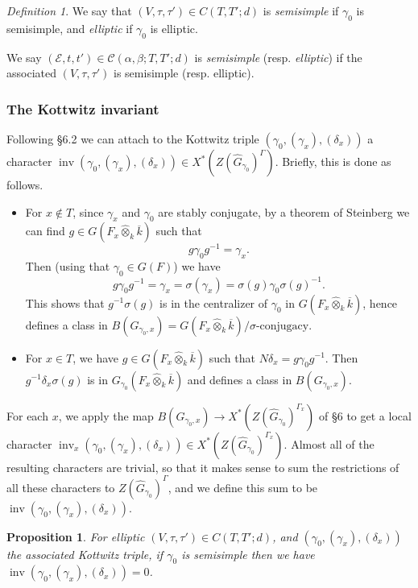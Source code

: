 \documentclass[reqno]{amsart}
\numberwithin{equation}{section}
\newcommand{\ol}[1]{\overline{#1}}
\newcommand{\wh}[1]{\widehat{#1}}
\newcommand{\Cal}[1]{\mathcal{#1}}
\DeclareMathOperator{\inv}{inv}
\newtheorem{prop}[thm]{Proposition}
\theoremstyle{remark}
\newtheorem{defn}[thm]{Definition}
\numberwithin{equation}{section}
\begin{document}
\begin{defn}
We say that $(V, \tau, \tau') \in C(T,T';d)$ is \emph{semisimple} if $\gamma_0$  is semisimple, and \emph{elliptic} if $\gamma_0$ is elliptic. 

We say $(\Cal{E},t, t')  \in \Cal{C}(\alpha, \beta; T,T'; d)$ is \emph{semisimple} (resp. \emph{elliptic}) if the associated $(V,\tau,\tau')$ is semisimple (resp. elliptic). 


\end{defn}

\subsubsection{The Kottwitz invariant} Following \cite{NgoNgo} \S 6.2 we can attach to the Kottwitz triple $(\gamma_0, (\gamma_x), (\delta_x))$ a character $\inv(\gamma_0, (\gamma_x), (\delta_x)) \in X^*(Z(\wh{G}_{\gamma_0})^{\Gamma})$. Briefly, this is done as follows. 

\begin{itemize}
\item For $x \notin T$, since $\gamma_x$ and $\gamma_0$ are stably conjugate, by a theorem of Steinberg we can find $g \in G(F_x \wh{\otimes}_{k} \ol{k})$ such that 
\[
g \gamma_0 g^{-1} = \gamma_x.
\] 
Then (using that $\gamma_0 \in G(F)$) we have 
\[
g \gamma_0 g^{-1} = \gamma_x = \sigma(\gamma_x) = \sigma(g) \gamma_0 \sigma(g)^{-1}.
\]
This shows that $g^{-1}\sigma(g)$ is in the centralizer  of $\gamma_0$ in $G(F_x \wh{\otimes}_{k} \ol{k})$, hence defines a class in $B(G_{\gamma_0, x}) = G(F_x \wh{\otimes}_{k} \ol{k})/\text{$\sigma$-conjugacy}$. 

\item For $x \in T$, we have $g \in G(F_x \wh{\otimes}_{k} \ol{k})$ such that $N \delta_x = g \gamma_0 g^{-1}$. Then $g^{-1} \delta_x \sigma(g)$ is in $G_{\gamma_0}(F_x\wh{\otimes}_{k} \ol{k})$ and defines a class in $B(G_{\gamma_0,x})$. 
\end{itemize}
For each $x$, we apply the map $B(G_{\gamma_0, x}) \rightarrow X^*(Z(\wh{G}_{\gamma_0})^{\Gamma_x})$ of \cite{Kott90} \S 6 to get a local character $\inv_x(\gamma_0, (\gamma_x), (\delta_x)) \in  X^*(Z(\wh{G}_{\gamma_0})^{\Gamma_x})$. Almost all of the resulting characters are trivial, so that it makes sense to sum the restrictions of all these characters to $Z(\wh{G}_{\gamma_0})^{\Gamma}$, and we define this sum to be $\inv(\gamma_0, (\gamma_x), (\delta_x))$. 


\begin{prop}\cite{NgoNgo} For elliptic $(V,\tau, \tau') \in C(T,T'; d)$, and $(\gamma_0, (\gamma_x), (\delta_x))$ the associated Kottwitz triple, if $\gamma_0$ is semisimple then we have $\inv(\gamma_0, (\gamma_x), (\delta_x)) = 0$.
\end{prop}
\end{document}
